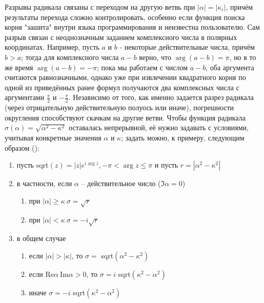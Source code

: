 \documentclass[a4paper, 12pt]{article}
\begin{document}
Разрывы радикала связаны с переходом на другую ветвь при $|\alpha|=|\kappa_i|$, причём результаты перехода сложно контролировать, особенно если функция поиска корня "зашита" внутри языка программирования и неизвестна пользователю. Сам разрыв связан с неоднозначным заданием комплексного числа в полярных координатах. Например, пусть $a$ и $b$ - некоторые действительные числа, причём $b>a$; тогда для комплексного числа $a-b$ верно, что $\arg(a-b)=\pi$, но в то же время $\arg(a-b)=-\pi$; пока мы работаем с числом $a-b$, оба аргумента считаются равнозначными, однако уже при извлечении квадратного корня по одной из приведённых ранее формул получаются два комплексных числа с аргументами $\frac{\pi}{2}$ и $-\frac{\pi}{2}$. Независимо от того, как именно задается разрез радикала (через отрицательную действительную полуось или иначе), погрешности округления способствуют скачкам на другие ветви. Чтобы функция радикала $\sigma(\alpha)=\sqrt{\alpha^2-\kappa^2}$ оставалась непрерывной, её нужно задавать с условиями, учитывая конкретные значения $\alpha$ и $\kappa$; задать можно, к примеру, следующим образом (\cite{g89, new}):
\begin{enumerate}
    \item пусть sqrt$(z)=|z|e^{i\arg z},-\pi < \arg z \leq \pi$ и пусть $r=|\alpha^2-\kappa^2|$
    \item в частности, если $\alpha$ -- действительное число ($\Im \alpha=0$)
    \begin{enumerate}
        \item при $|\alpha|\geq\kappa\  \sigma = \sqrt{r}$ 
        \item при $|\alpha|<\kappa\  \sigma = -i\sqrt{r}$ 
    \end{enumerate}
    \item в общем случае 
    \begin{enumerate}
    \item если $|\alpha|>|\kappa|$, то $\sigma=$ sqrt$(\alpha^2-\kappa^2)$
        \item если $\mathrm{Re} \alpha \ \mathrm{Im} \alpha >0$, то $\sigma=i$ sqrt$(\kappa^2-\alpha^2)$
        \item иначе $\sigma=-i$ sqrt$(\kappa^2-\alpha^2)$
    \end{enumerate}
\end{enumerate}
\end{document}
